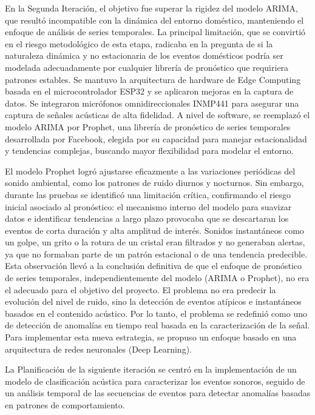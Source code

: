       En la Segunda Iteración, el objetivo fue superar la rigidez del modelo ARIMA, que resultó incompatible con la dinámica del entorno doméstico, manteniendo el enfoque de análisis de series temporales. La principal limitación, que se convirtió en el riesgo metodológico de esta etapa, radicaba en la pregunta de si la naturaleza dinámica y no estacionaria de los eventos domésticos podría ser modelada adecuadamente por cualquier librería de pronóstico que requiriera patrones estables. Se mantuvo la arquitectura de hardware de Edge Computing basada en el microcontrolador ESP32 y se aplicaron mejoras en la captura de datos. Se integraron micrófonos omnidireccionales INMP441 para asegurar una captura de señales acústicas de alta fidelidad. A nivel de software, se reemplazó el modelo ARIMA por Prophet, una librería de pronóstico de series temporales desarrollada por Facebook, elegida por su capacidad para manejar estacionalidad y tendencias complejas, buscando mayor flexibilidad para modelar el entorno.
      
      El modelo Prophet logró ajustarse eficazmente a las variaciones periódicas del sonido ambiental, como los patrones de ruido diurnos y nocturnos. Sin embargo, durante las pruebas se identificó una limitación crítica, confirmando el riesgo inicial asociado al pronóstico: el mecanismo interno del modelo para suavizar datos e identificar tendencias a largo plazo provocaba que se descartaran los eventos de corta duración y alta amplitud de interés. Sonidos instantáneos como un golpe, un grito o la rotura de un cristal eran filtrados y no generaban alertas, ya que no formaban parte de un patrón estacional o de una tendencia predecible. Esta observación llevó a la conclusión definitiva de que el enfoque de pronóstico de series temporales, independientemente del modelo (ARIMA o Prophet), no era el adecuado para el objetivo del proyecto. El problema no era predecir la evolución del nivel de ruido, sino la detección de eventos atípicos e instantáneos basados en el contenido acústico. Por lo tanto, el problema se redefinió como uno de detección de anomalías en tiempo real basada en la caracterización de la señal. Para implementar esta nueva estrategia, se propuso un enfoque basado en una arquitectura de redes neuronales (Deep Learning). 

      La Planificación de la siguiente iteración se centró en la implementación de un modelo de clasificación acústica para caracterizar los eventos sonoros, seguido de un análisis temporal de las secuencias de eventos para detectar anomalías basadas en patrones de comportamiento. 
      

